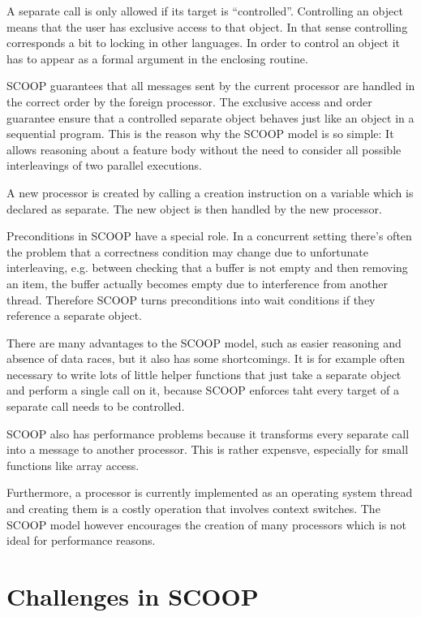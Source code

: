 \documentclass[a4paper,10pt]{article}
\begin{document}
A separate call is only allowed if its target is ``controlled''.
Controlling an object means that the user has exclusive access to that object.
In that sense controlling corresponds a bit to locking in other languages.
In order to control an object it has to appear as a formal argument in the enclosing routine.

SCOOP guarantees that all messages sent by the current processor are handled in the correct order by the foreign processor.
The exclusive access and order guarantee ensure that a controlled separate object behaves just like an object in a sequential program.
This is the reason why the SCOOP model is so simple: 
It allows reasoning about a feature body without the need to consider all possible interleavings of two parallel executions.

A new processor is created by calling a creation instruction on a variable which is declared as separate.
The new object is then handled by the new processor.

Preconditions in SCOOP have a special role.
In a concurrent setting there's often the problem that a correctness condition may change due to unfortunate interleaving, 
e.g. between checking that a buffer is not empty and then removing an item, the buffer actually becomes empty due to interference from another thread.
Therefore SCOOP turns preconditions into wait conditions if they reference a separate object.

There are many advantages to the SCOOP model, such as easier reasoning and absence of data races, but it also has some shortcomings.
It is for example often necessary to write lots of little helper functions that just take a separate object and perform a single call on it,
because SCOOP enforces taht every target of a separate call needs to be controlled.

SCOOP also has performance problems because it transforms every separate call into a message to another processor.
This is rather expensve, especially for small functions like array access.

Furthermore, a processor is currently implemented as an operating system thread and creating them is a costly operation that involves context switches.
The SCOOP model however encourages the creation of many processors which is not ideal for performance reasons.

\section{Challenges in SCOOP}
\label{sec:scoop-challenges}
\end{document}
